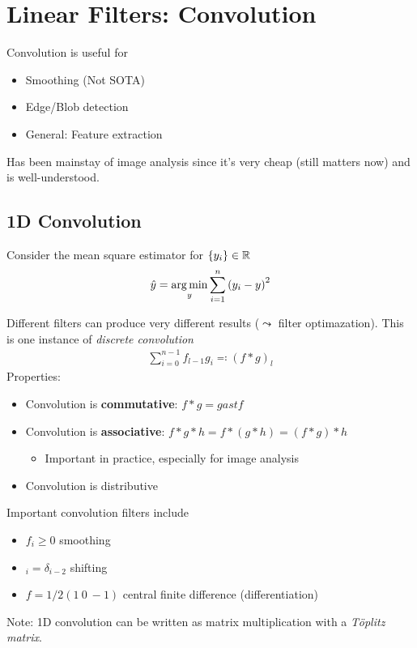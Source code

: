 \section{Linear Filters: Convolution}
Convolution is useful for
\begin{itemize}
\item Smoothing (Not SOTA)
\item Edge/Blob detection
\item General: Feature extraction
\end{itemize}
Has been mainstay of image analysis since it's very cheap (still
matters now) and is well-understood.

\subsection*{1D Convolution}
Consider the mean square estimator for $\{y_i\} \in \mathbb{R}$
\begin{gather*}
  \hat{y} = \operatorname*{arg\,min}_y \sum_{i=1}^{n}{(y_i - y)}^2
\end{gather*}

Different filters can produce very different results ($\leadsto$
filter optimazation). This is one instance of \emph{discrete
  convolution}
\begin{gather*}
  \sum_{i=0}^{n-1}f_{l-1}g_i \eqqcolon (f \ast g)_l
\end{gather*}
Properties:
\begin{itemize}
\item Convolution is \textbf{commutative}: $f \ast g = g ast f$
\item Convolution is \textbf{associative}:
  $f \ast g \ast h = f \ast (g \ast h) = (f \ast g) \ast h$
  \begin{itemize}
  \item Important in practice, especially for image analysis
  \end{itemize}
\item Convolution is distributive
\end{itemize}
Important convolution filters include
\begin{itemize}
\item $f_i \ge 0$ smoothing
\item $_i = \delta_{i-2}$ shifting
\item $f = 1/2(1 \ 0 \ -1)$ central finite difference
  (differentiation)
\end{itemize}
Note: 1D convolution can be written as matrix multiplication with a
\emph{Töplitz matrix}.  

